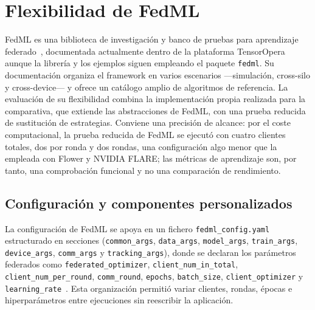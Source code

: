 
\section{Flexibilidad de FedML}\label{sec:flex-fedml}

FedML es una biblioteca de investigación y banco de pruebas para aprendizaje
federado~\parencite{he2020fedml}, documentada actualmente dentro de la plataforma
TensorOpera aunque la librería y los ejemplos siguen empleando el paquete
\texttt{fedml}. Su documentación organiza el framework en varios escenarios
—simulación, cross-silo y cross-device— y ofrece un catálogo amplio de algoritmos
de referencia. La evaluación de su flexibilidad combina la implementación propia
realizada para la comparativa, que extiende las abstracciones de FedML, con una
prueba reducida de sustitución de estrategias. Conviene una precisión de alcance:
por el coste computacional, la prueba reducida de FedML se ejecutó con cuatro
clientes totales, dos por ronda y dos rondas, una configuración algo menor que la
empleada con Flower y NVIDIA FLARE; las métricas de aprendizaje son, por tanto, una
comprobación funcional y no una comparación de rendimiento.

\subsection{Configuración y componentes personalizados}\label{subsec:flex-fedml-config}

La configuración de FedML se apoya en un fichero \texttt{fedml\_config.yaml}
estructurado en secciones (\texttt{common\_args}, \texttt{data\_args},
\texttt{model\_args}, \texttt{train\_args}, \texttt{device\_args},
\texttt{comm\_args} y \texttt{tracking\_args}), donde se declaran los parámetros
federados como \texttt{federated\_optimizer}, \texttt{client\_num\_in\_total},
\texttt{client\_num\_per\_round}, \texttt{comm\_round}, \texttt{epochs},
\texttt{batch\_size}, \texttt{client\_optimizer} y \texttt{learning\_rate}~\parencite{fedmlSimApi}.
Esta organización permitió variar clientes, rondas, épocas e hiperparámetros entre
ejecuciones sin reescribir la aplicación.

